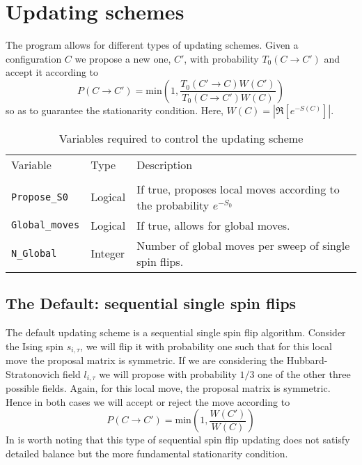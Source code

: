 
\section{Updating schemes}\label{sec:updating}
%
The program allows for different types of updating schemes.    Given a configuration $C$ we propose a new one, $C'$, with probability $T_0(C \rightarrow C')$  and accept it according to 
\begin{equation}
	P(C \rightarrow C') =  \text{min}  \left( 1, \frac{T_0(C' \rightarrow C) W(C')}{T_0(C \rightarrow C') W(C)} \right)
\end{equation}
so as to guarantee the stationarity condition.  Here, $ W(C) = \left| \Re \left[ e^{-S(C)} \right] \right|   $.

\begin{table}[h]
   \begin{tabular}{@{} l l l @{}}\toprule
        Variable  &  Type                  &  Description   \\
         \\\midrule
       \texttt{Propose\_S0}   &    Logical       &  If true, proposes local moves according to the probability $e^{-S_0}$ \\
       \texttt{Global\_moves} & Logical       & If true, allows for global moves. \\
        \texttt{N\_Global }       & Integer        &   Number of global moves per sweep of single spin flips.
         \\\bottomrule
   \end{tabular}
   \caption{   Variables  required to control the updating scheme    \label{table:Updating_schemes}}
\end{table}
\subsection{The Default: sequential  single spin flips}
 The default updating scheme is a  sequential single  spin flip algorithm.   Consider   the Ising spin $s_{i,\tau}$, we will flip it with probability one such that for  this local move  the  proposal matrix is symmetric.  If we are considering the Hubbard-Stratonovich field $l_{i,\tau}$  we will propose with probability $1/3$ one  of the other three  possible fields.   Again, for this local move, the proposal matrix is symmetric.  Hence in both cases we will accept or reject the move according to 
 \begin{equation}
 	P(C \rightarrow C') =  \text{min}  \left( 1, \frac{ W(C')}{W(C)} \right)
 \end{equation}
 In is worth noting that this type of sequential spin flip updating does not satisfy detailed balance but the more fundamental stationarity condition. 
